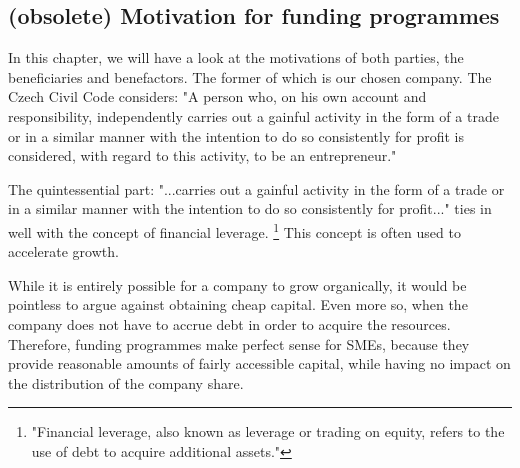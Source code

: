 \documentclass[12pt,oneside]{fithesis2}
\begin{document}
\subsection{(obsolete) Motivation for funding programmes}\label{motivation}
In this chapter, we will have a look at the motivations of both parties, the beneficiaries and benefactors. The former of which is our chosen company.
The Czech Civil Code considers: "A person who, on his own account and responsibility, independently carries out a gainful activity in the form of a trade or in a similar manner with the intention to do so consistently for profit is considered, with regard to this activity, to be an entrepreneur."\cite{entrepreneur-law}
\par
The quintessential part: "...carries out a gainful activity in the form of a trade or in a similar manner with the intention to do so consistently for profit..."\cite{entrepreneur-law} ties in well with the concept of financial leverage. \footnote{"Financial leverage, also known as leverage or trading on equity, refers to the use of debt to acquire additional assets."\cite{financial-leverage}} This concept is often used to accelerate growth.
\par
While it is entirely possible for a company to grow organically, it would be pointless to argue against obtaining cheap capital. Even more so, when the company does not have to accrue debt in order to acquire the resources. Therefore, funding programmes make perfect sense for SMEs, because they provide reasonable amounts of fairly accessible capital, while having no impact on the distribution of the company share.
\end{document}
